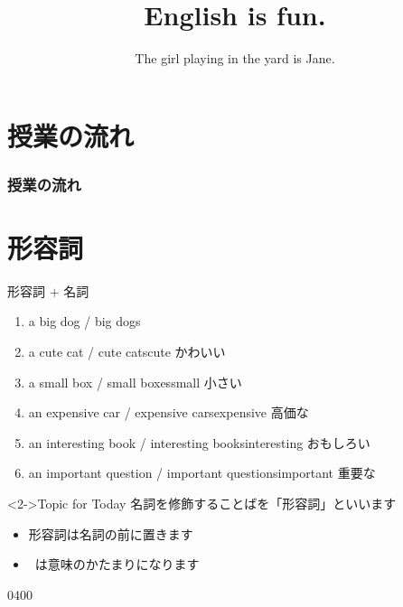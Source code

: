 \documentclass[aspectratio=169,xcolor={dvipsnames,table}]{beamer}
\title{English is fun.}
\subtitle{The girl playing in the yard is Jane.}
\author{}
\institute[]{}
\date[]
\begin{document}
\begin{frame}[plain]
  \titlepage
\end{frame}

\section*{授業の流れ}
\begin{frame}[plain]
  \frametitle{授業の流れ}
  \tableofcontents
\end{frame}

\section{形容詞}
 \begin{frame}[plain]{形容詞 $+$ 名詞}
 \begin{enumerate}
  \item a big dog / big dogs
  \item a cute cat / cute cats\hfill{\scriptsize cute  かわいい}
  \item a small box / small boxes\hfill{\scriptsize small  小さい}
  \item an expensive car / expensive cars\hfill{\scriptsize expensive  高価な}
  \item an interesting book / interesting books\hfill{\scriptsize interesting  おもしろい}
  \item an important question / important questions\hfill{\scriptsize important  重要な}
 \end{enumerate}

\begin{block}<2->{Topic for Today}\small
名詞を修飾することばを「形容詞」といいます
\begin{itemize}[square]\small
 \item 形容詞は名詞の前に置きます
 \item {}\,\,\,は意味のかたまりになります
 \end{itemize}
     \end{block}

\mbox{}\hfill{\tiny 0400}\,{\scriptsize {}}
 \end{frame}
\end{document}
